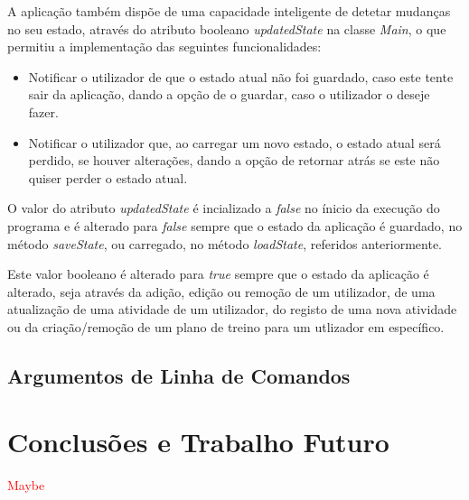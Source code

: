 \documentclass[a4paper,12pt]{scrreprt}
\begin{document}
A aplicação também dispõe de uma capacidade inteligente de detetar mudanças no seu estado, através do atributo booleano \textit{updatedState} na classe \textit{Main}, o que permitiu a implementação das seguintes funcionalidades:

\begin{itemize}
    \item Notificar o utilizador de que o estado atual não foi guardado, caso este tente sair da aplicação, dando a opção de o guardar, caso o utilizador o deseje fazer.
    \item Notificar o utilizador que, ao carregar um novo estado, o estado atual será perdido, se houver alterações, dando a opção de retornar atrás se este não quiser perder o estado atual.
\end{itemize}

O valor do atributo \textit{updatedState} é incializado a \textit{false} no ínicio da execução do programa e é alterado para \textit{false} sempre que o estado da aplicação é guardado, no método \textit{saveState}, ou carregado, no método \textit{loadState}, referidos anteriormente.

Este valor booleano é alterado para \textit{true} sempre que o estado da aplicação é alterado, seja através da adição, edição ou remoção de um utilizador, de uma atualização de uma atividade de um utilizador, do registo de uma nova atividade ou da criação/remoção de um plano de treino para um utlizador em específico.

\section{Argumentos de Linha de Comandos}



\chapter{Conclusões e Trabalho Futuro}
    \textcolor{red}{
        Maybe
    }

\end{document}
